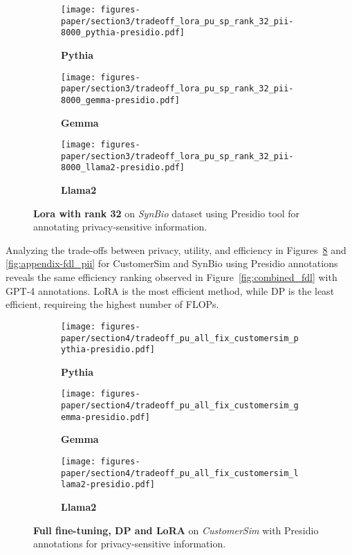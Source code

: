 \begin{figure}[h!]
    \centering
    \begin{subfigure}{0.48\linewidth}
    \centering
    \texttt{[image: figures-paper/section3/tradeoff\_lora\_pu\_sp\_rank\_32\_pii-8000\_pythia-presidio.pdf]}
    \caption{\textbf{Pythia}}
    \label{fig:appendix-lora32_piia}
    \end{subfigure}
    \begin{subfigure}{0.48\linewidth}
    \centering
    \texttt{[image: figures-paper/section3/tradeoff\_lora\_pu\_sp\_rank\_32\_pii-8000\_gemma-presidio.pdf]}
    \caption{\textbf{Gemma}}
    \label{fig:appendix-lora32_piib}
    \end{subfigure}
    \begin{subfigure}{0.48\linewidth}
    \centering
    \texttt{[image: figures-paper/section3/tradeoff\_lora\_pu\_sp\_rank\_32\_pii-8000\_llama2-presidio.pdf]}
    \caption{\textbf{Llama2}}
    \label{fig:appendix-lora32_piic}
    \end{subfigure}
    \caption{\textbf{Lora with rank 32} on \emph{SynBio} dataset using Presidio tool for annotating privacy-sensitive information.}
    \label{fig:appendix-lora32-pii}
\end{figure}

\vspace{4mm}
Analyzing the trade-offs between privacy, utility, and efficiency in Figures~\ref{fig:appendix-fdl_csim} and \ref{fig:appendix-fdl_pii} for CustomerSim and SynBio using Presidio annotations reveals the same efficiency ranking observed in Figure~\ref{fig:combined_fdl} with GPT-4 annotations. LoRA is the most efficient method, while DP is the least efficient, requireing the highest number of FLOPs.

\begin{figure}[h!]
    \centering
    \begin{subfigure}{0.48\linewidth}
    \centering
    \texttt{[image: figures-paper/section4/tradeoff\_pu\_all\_fix\_customersim\_pythia-presidio.pdf]}
    \caption{\textbf{Pythia}}
    \label{fig:appendix-fdl_csim1}
    \end{subfigure}
    \begin{subfigure}{0.48\linewidth}
    \centering
    \texttt{[image: figures-paper/section4/tradeoff\_pu\_all\_fix\_customersim\_gemma-presidio.pdf]}
    \caption{\textbf{Gemma}}
    \label{fig:appendix-fdl_csim2}
    \end{subfigure}
    \begin{subfigure}{0.48\linewidth}
    \centering
    \texttt{[image: figures-paper/section4/tradeoff\_pu\_all\_fix\_customersim\_llama2-presidio.pdf]}
    \caption{\textbf{Llama2}}
    \label{fig:appendix-fdl_csim3}
    \end{subfigure}
    \caption{\textbf{Full fine-tuning, DP and LoRA} on \emph{CustomerSim} with Presidio annotations for privacy-sensitive information.}
    \label{fig:appendix-fdl_csim}
\end{figure}


